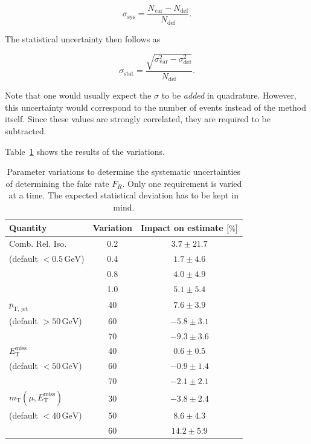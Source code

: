 \begin{equation}
  \label{eq:frsysabs}
  \sigma_{\text{sys}} = \frac{N_{\text{var}} - N_{\text{def}}}{N_{\text{def}}}.
\end{equation}

\noindent The statistical uncertainty then follows as

\begin{equation}
  \label{eq:frstatabs}
  \sigma_{\text{stat}} = \frac{\sqrt{\sigma_{\text{var}}^2 - \sigma_{\text{def}}^2}}{N_{\text{def}}}.
\end{equation}

\noindent Note that one would usually expect the $\sigma$ to be \textit{added} in quadrature. However, this uncertainty would correspond to the number of events instead of the method itself. Since these values are strongly correlated, they are required to be subtracted.

Table~\ref{tab:tlratiosys} shows the results of the variations.

\begin{table}[htb!]
  \centering
  \begin{tabular}{|l|c|c|}
\hline
Quantity & Variation & Impact on estimate $[\pct]$ \\
\hline
\hline
Comb. Rel. Iso. & 0.2 & $3.7 \pm 21.7$ \\
(default $< 0.5\,\text{GeV}$) & 0.4 & $1.7 \pm 4.6$ \\
 & 0.8 & $4.0 \pm 4.9$ \\
 & 1.0 & $5.1 \pm 5.4$ \\
\hline
$p_{\text{T, jet}}$ & 40 & $7.6 \pm 3.9$ \\
(default $> 50\,\text{GeV}$) & 60 & $-5.8 \pm 3.1$ \\
 & 70 & $-9.3 \pm 3.6$ \\
\hline
$E_{\text{T}}^{\text{miss}}$ & 40 & $0.6 \pm 0.5$ \\
(default $< 50\,\text{GeV}$) & 60 & $-0.9 \pm 1.4$ \\
 & 70 & $-2.1 \pm 2.1$ \\
\hline
$m_{\text{T}}(\mu, E_{\text{T}}^{\text{miss}})$ & 30 & $-3.8 \pm 2.4$ \\
(default $< 40\,\text{GeV}$) & 50 & $8.6 \pm 4.3$ \\
 & 60 & $14.2 \pm 5.9$ \\
\hline
  \end{tabular}
  \caption{Parameter variations to determine the systematic uncertainties of determining the fake rate $F_R$. Only one requirement is varied at a time. The expected statistical deviation has to be kept in mind.}
  \label{tab:tlratiosys}
\end{table}

